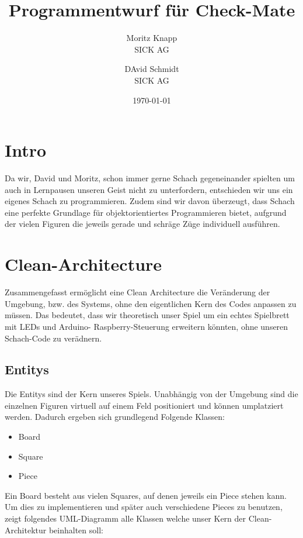 \documentclass{article}
\title{Programmentwurf für Check-Mate}
\author{Moritz Knapp  \\
	SICK AG  \\
	\and 
	DAvid Schmidt \\
	SICK AG \\
	}
\date{\today}
\begin{document}
\maketitle

\tableofcontents
\newpage

\section{Intro}

Da wir, David und Moritz, schon immer gerne Schach gegeneinander spielten um auch in Lernpausen unseren Geist nicht zu unterfordern, entschieden wir uns ein eigenes Schach zu programmieren. 
Zudem sind wir davon überzeugt, dass Schach eine perfekte Grundlage für objektorientiertes Programmieren bietet, aufgrund der vielen Figuren die jeweils gerade und schräge Züge individuell ausführen.

\section{Clean-Architecture} \label{sec:cleanArc}
Zusammengefasst ermöglicht eine Clean Architecture die Veränderung der Umgebung, bzw. des Systems, ohne den eigentlichen Kern des Codes anpassen zu müssen.
Das bedeutet, dass wir theoretisch unser Spiel um ein echtes Spielbrett mit LEDs und Arduino- Raspberry-Steuerung erweitern könnten, ohne unseren Schach-Code zu verädnern.

\subsection{Entitys}
Die Entitys sind der Kern unseres Spiels. Unabhängig von der Umgebung sind die einzelnen Figuren virtuell auf einem Feld positioniert und können umplatziert werden.
Dadurch ergeben sich grundlegend Folgende Klassen: 

\begin{center}
	\begin{itemize}
		\item Board
		\item Square
		\item Piece
	\end{itemize}
\end{center}

Ein Board besteht aus vielen Squares, auf denen jeweils ein Piece stehen kann. Um dies zu implementieren und später auch verschiedene Pieces zu benutzen, zeigt folgendes UML-Diagramm alle Klassen welche unser Kern der Clean-Architektur beinhalten soll:
\end{document}
